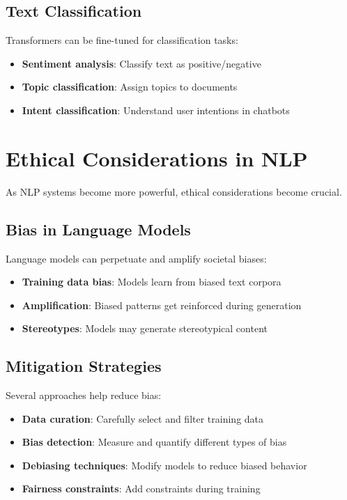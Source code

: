 \documentclass[11pt,a4paper]{article}
\theoremstyle{definition}
\theoremstyle{plain}
\theoremstyle{remark}
\begin{document}
\subsection{Text Classification}

Transformers can be fine-tuned for classification tasks:

\begin{itemize}
    \item \textbf{Sentiment analysis}: Classify text as positive/negative
    \item \textbf{Topic classification}: Assign topics to documents
    \item \textbf{Intent classification}: Understand user intentions in chatbots
\end{itemize}

\section{Ethical Considerations in NLP}

As NLP systems become more powerful, ethical considerations become crucial.

\subsection{Bias in Language Models}

Language models can perpetuate and amplify societal biases:

\begin{itemize}
    \item \textbf{Training data bias}: Models learn from biased text corpora
    \item \textbf{Amplification}: Biased patterns get reinforced during generation
    \item \textbf{Stereotypes}: Models may generate stereotypical content
\end{itemize}

\subsection{Mitigation Strategies}

Several approaches help reduce bias:

\begin{itemize}
    \item \textbf{Data curation}: Carefully select and filter training data
    \item \textbf{Bias detection}: Measure and quantify different types of bias
    \item \textbf{Debiasing techniques}: Modify models to reduce biased behavior
    \item \textbf{Fairness constraints}: Add constraints during training
\end{itemize}
\end{document}
